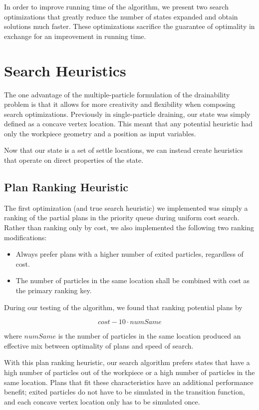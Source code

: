 In order to improve running time of the algorithm, we present two search optimizations that greatly reduce the number of states expanded and obtain solutions much faster. These optimizations sacrifice the guarantee of optimality in exchange for an improvement in running time.

\section{Search Heuristics}

The one advantage of the multiple-particle formulation of the drainability problem is that it allows for more creativity and flexibility when composing search optimizations. Previously in single-particle draining, our state was simply defined as a concave vertex location. This meant that any potential heuristic had only the workpiece geometry and a position as input variables.

Now that our state is a set of settle locations, we can instead create heuristics that operate on direct properties of the state.

\subsection{Plan Ranking Heuristic}

The first optimization (and true search heuristic) we implemented was simply a ranking of the partial plans in the priority queue during uniform cost search. Rather than ranking only by cost, we also implemented the following two ranking modifications:

\begin{itemize}
\item Always prefer plans with a higher number of exited particles, regardless of cost.
\item The number of particles in the same location shall be combined with cost as the primary ranking key.
\end{itemize}

During our testing of the algorithm, we found that ranking potential plans by

$$
cost - 10 \cdot numSame
$$

where $numSame$ is the number of particles in the same location produced an effective mix between optimality of plans and speed of search.

With this plan ranking heuristic, our search algorithm prefers states that have a high number of particles out of the workpiece or a high number of particles in the same location. Plans that fit these characteristics have an additional performance benefit; exited particles do not have to be simulated in the transition function, and each concave vertex location only has to be simulated once.

